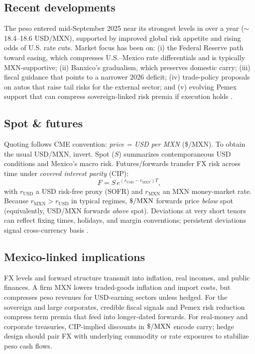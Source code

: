 \documentclass[10pt,a4paper]{article} %
\begin{document}
\subsection{Recent developments}
The peso entered mid-September 2025 near its strongest levels in over a year (\(\sim\)18.4–18.6 USD/MXN), supported by improved global risk appetite and rising odds of U.S. rate cuts. Market focus has been on: (i) the Federal Reserve path toward easing, which compresses U.S.–Mexico rate differentials and is typically MXN-supportive; (ii) Banxico’s gradualism, which preserves domestic carry; (iii) fiscal guidance that points to a narrower 2026 deficit; (iv) trade-policy proposals on autos that raise tail risks for the external sector; and (v) evolving Pemex support that can compress sovereign-linked risk premia if execution holds \citep{reuters_usdmxn_quote,reuters_mx_markets_11sep,reuters_mx_markets_12sep,reuters_fed_poll_2025,reuters_cenbank_graphic_2025,reuters_banxico_jun26_2025,banxico_calendar_2025,reuters_budget_2026_2025,reuters_tariffs_autos_2025,reuters_pemex_plan_2025,reuters_fitch_pemex_2025}.

\subsection{Spot \& futures}
Quoting follows CME convention: \emph{price = USD per MXN} (\$/MXN). To obtain the usual USD/MXN, invert. Spot (\(S\)) summarizes contemporaneous USD conditions and Mexico’s macro risk. Futures/forwards transfer FX risk across time under \emph{covered interest parity} (CIP):
\[
F = S\,e^{(r_{\mathrm{USD}}-r_{\mathrm{MXN}})T},
\]
with \(r_{\mathrm{USD}}\) a USD risk-free proxy (SOFR) and \(r_{\mathrm{MXN}}\) an MXN money-market rate. Because \(r_{\mathrm{MXN}}>r_{\mathrm{USD}}\) in typical regimes, \(\$/{\rm MXN}\) forwards price \emph{below} spot (equivalently, USD/MXN forwards \emph{above} spot). Deviations at very short tenors can reflect fixing times, holidays, and margin conventions; persistent deviations signal cross-currency basis \citep{bis_cip_2016,bis_cip_2024,frbny_sofr,frbny_sofr_index,cme_fx_overview,cme_mxn_product,cme_mxn_rulebook}.

\subsection{Mexico-linked implications}
FX levels and forward structure transmit into inflation, real incomes, and public finances. A firm MXN lowers traded-goods inflation and import costs, but compresses peso revenues for USD-earning sectors unless hedged. For the sovereign and large corporates, credible fiscal signals and Pemex risk reduction compress term premia that feed into longer-dated forwards. For real-money and corporate treasuries, CIP-implied discounts in \(\$/{\rm MXN}\) encode carry; hedge design should pair FX with underlying commodity or rate exposures to stabilize peso cash flows.
\end{document}
